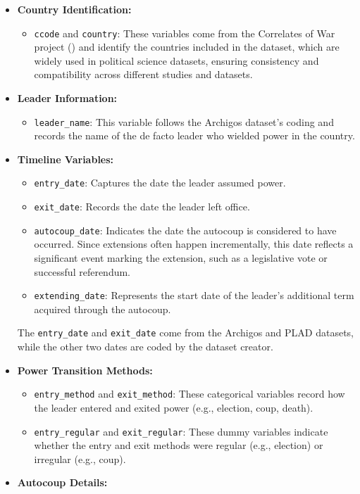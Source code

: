 \documentclass[
  12pt,
]{report}
\providecommand{\tightlist}{%
  \setlength{\itemsep}{0pt}\setlength{\parskip}{0pt}}\usepackage{longtable,booktabs,array}
\begin{document}
\begin{itemize}
\item
  \textbf{Country Identification:}

  \begin{itemize}
  \tightlist
  \item
    \texttt{ccode} and \texttt{country}: These variables come from the
    Correlates of War project () and identify the countries included in the dataset, which
    are widely used in political science datasets, ensuring consistency
    and compatibility across different studies and datasets.
  \end{itemize}
\item
  \textbf{Leader Information:}

  \begin{itemize}
  \tightlist
  \item
    \texttt{leader\_name}: This variable follows the Archigos dataset's
    coding and records the name of the de facto leader who wielded power
    in the country.
  \end{itemize}
\item
  \textbf{Timeline Variables:}

  \begin{itemize}
  \item
    \texttt{entry\_date}: Captures the date the leader assumed power.
  \item
    \texttt{exit\_date}: Records the date the leader left office.
  \item
    \texttt{autocoup\_date}: Indicates the date the autocoup is
    considered to have occurred. Since extensions often happen
    incrementally, this date reflects a significant event marking the
    extension, such as a legislative vote or successful referendum.
  \item
    \texttt{extending\_date}: Represents the start date of the leader's
    additional term acquired through the autocoup.
  \end{itemize}

  The \texttt{entry\_date} and \texttt{exit\_date} come from the
  Archigos and PLAD datasets, while the other two dates are coded by the
  dataset creator.
\item
  \textbf{Power Transition Methods:}

  \begin{itemize}
  \item
    \texttt{entry\_method} and \texttt{exit\_method}: These categorical
    variables record how the leader entered and exited power (e.g.,
    election, coup, death).
  \item
    \texttt{entry\_regular} and \texttt{exit\_regular}: These dummy
    variables indicate whether the entry and exit methods were regular
    (e.g., election) or irregular (e.g., coup).
  \end{itemize}
\item
  \textbf{Autocoup Details:}


\end{itemize}
\end{document}
